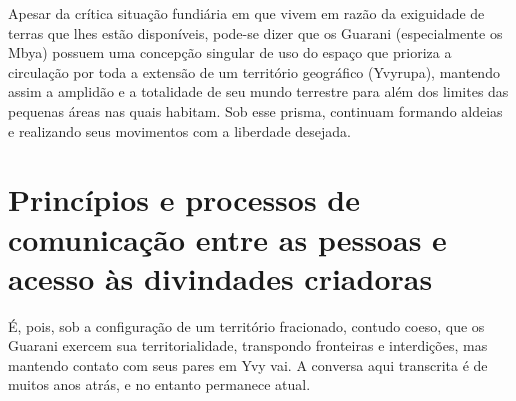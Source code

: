 Apesar da crítica situação fundiária em que vivem em razão da exiguidade
de terras que lhes estão disponíveis, pode-se dizer que os Guarani
(especialmente os Mbya) possuem uma concepção singular de uso do espaço
que prioriza a circulação por toda a extensão de um território
geográfico (Yvyrupa), mantendo assim a amplidão e a totalidade de seu
mundo terrestre para além dos limites das pequenas áreas nas quais
habitam. Sob esse prisma, continuam formando aldeias e realizando seus
movimentos com a liberdade desejada.  

\section{Princípios e processos de comunicação entre as pessoas e acesso às
divindades criadoras} 

É, pois, sob a configuração de um território fracionado, contudo coeso,
que os Guarani exercem sua territorialidade, transpondo fronteiras e
interdições, mas mantendo contato com seus pares em Yvy vai. A conversa
aqui transcrita é de muitos anos atrás, e no entanto permanece atual. 

